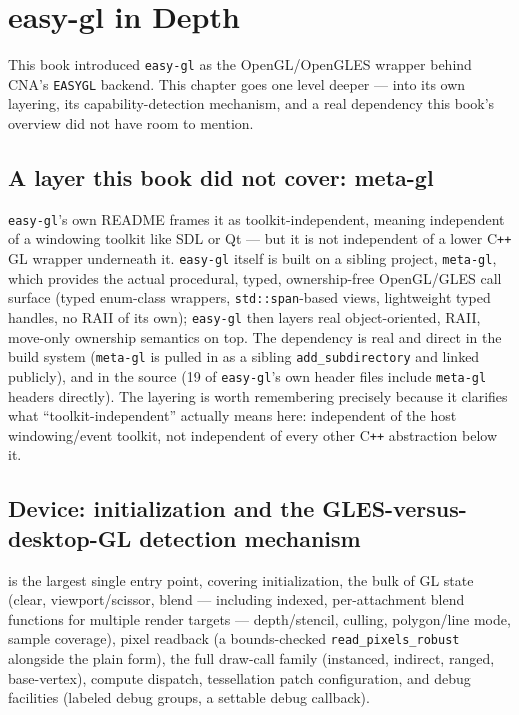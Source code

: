 \chapter{easy-gl in Depth}
\label{ch:easygl-deep-dive}

This book introduced \texttt{easy-gl} as the OpenGL/OpenGLES wrapper behind CNA's
\texttt{EASYGL} backend. This chapter goes one level deeper --- into its own layering, its
capability-detection mechanism, and a real dependency this book's overview did not have room
to mention.

\section{A layer this book did not cover: meta-gl}

\texttt{easy-gl}'s own README frames it as toolkit-independent, meaning independent of a
windowing toolkit like SDL or Qt --- but it is not independent of a lower C\texttt{++} GL
wrapper underneath it. \texttt{easy-gl} itself is built on a sibling project,
\texttt{meta-gl}, which provides the actual procedural, typed, ownership-free OpenGL/GLES
call surface (typed enum-class wrappers, \texttt{std::span}-based views, lightweight typed
handles, no RAII of its own); \texttt{easy-gl} then layers real object-oriented, RAII,
move-only ownership semantics on top. The dependency is real and direct in the build system
(\texttt{meta-gl} is pulled in as a sibling \texttt{add\_subdirectory} and linked publicly),
and in the source (19 of \texttt{easy-gl}'s own header files include \texttt{meta-gl} headers
directly). The layering is worth remembering precisely because it clarifies what
``toolkit-independent'' actually means here: independent of the host windowing/event toolkit,
not independent of every other C\texttt{++} abstraction below it.

\section{Device: initialization and the GLES-versus-desktop-GL detection mechanism}

 is the largest single entry point, covering initialization, the
bulk of GL state (clear, viewport/scissor, blend --- including indexed, per-attachment blend
functions for multiple render targets --- depth/stencil, culling, polygon/line mode, sample
coverage), pixel readback (a bounds-checked \texttt{read\_pixels\_robust} alongside the plain
form), the full draw-call family (instanced, indirect, ranged, base-vertex), compute
dispatch, tessellation patch configuration, and debug facilities (labeled debug groups, a
settable debug callback).

